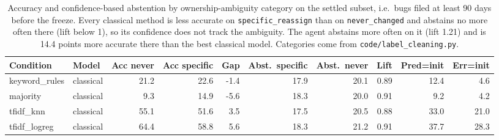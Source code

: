 \begin{table}[t]\centering
\caption{Accuracy and confidence-based abstention by ownership-ambiguity category on the settled subset, i.e.\ bugs filed at least 90 days before the freeze. Every classical method is less accurate on \texttt{specific\_reassign} than on \texttt{never\_changed} and abstains no more often there (lift below 1), so its confidence does not track the ambiguity. The agent abstains more often on it (lift 1.21) and is 14.4 points more accurate there than the best classical model. Categories come from \texttt{code/label\_cleaning.py}.}
\label{tab:ambiguity-test2026-settled}
\begin{tabular}{llrrrrrrrr}
\toprule
Condition & Model & Acc never & Acc specific & Gap & Abst.\ specific & Abst.\ never & Lift & Pred=init & Err=init \\
\midrule
keyword\_rules & classical & 21.2 & 22.6 & -1.4 & 17.9 & 20.1 & 0.89 & 12.4 & 4.6 \\
majority & classical & 9.3 & 14.9 & -5.6 & 18.3 & 20.0 & 0.91 & 9.2 & 4.2 \\
tfidf\_knn & classical & 55.1 & 51.6 & 3.5 & 17.5 & 20.5 & 0.88 & 33.0 & 21.0 \\
tfidf\_logreg & classical & 64.4 & 58.8 & 5.6 & 18.3 & 21.2 & 0.91 & 37.7 & 28.3 \\
\bottomrule
\end{tabular}
\end{table}
